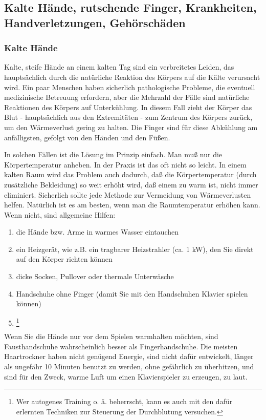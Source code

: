 
\subsection{Kalte Hände, rutschende Finger, Krankheiten, Handverletzungen, Gehörschäden}
\label{c1iii10}

\subsubsection{Kalte Hände}

Kalte, steife Hände an einem kalten Tag sind ein verbreitetes Leiden, das hauptsächlich durch die natürliche Reaktion des Körpers auf die Kälte verursacht wird.
Ein paar Menschen haben sicherlich pathologische Probleme, die eventuell medizinische Betreuung erfordern, aber die Mehrzahl der Fälle sind natürliche Reaktionen des Körpers auf Unterkühlung.
In diesem Fall zieht der Körper das Blut - hauptsächlich aus den Extremitäten - zum Zentrum des Körpers zurück, um den Wärmeverlust gering zu halten.
Die Finger sind für diese Abkühlung am anfälligsten, gefolgt von den Händen und den Füßen.

In solchen Fällen ist die Lösung im Prinzip einfach.
Man muß nur die Körpertemperatur anheben.
In der Praxis ist das oft nicht so leicht.
In einem kalten Raum wird das Problem auch dadurch, daß die Körpertemperatur (durch zusätzliche Bekleidung) so weit erhöht wird, daß einem zu warm ist, nicht immer eliminiert.
Sicherlich sollte jede Methode zur Vermeidung von Wärmeverlusten helfen.
Natürlich ist es am besten, wenn man die Raumtemperatur erhöhen kann.
Wenn nicht, sind allgemeine Hilfen:
\begin{enumerate}[label={\arabic*.}] 
\item die Hände bzw. Arme in warmes Wasser eintauchen
\item ein Heizgerät, wie z.B. ein tragbarer Heizstrahler (ca. 1 kW), den Sie direkt auf den Körper richten können
\item dicke Socken, Pullover oder thermale Unterwäsche
\item Handschuhe ohne Finger (damit Sie mit den Handschuhen Klavier spielen können)
\item \footnote{Wer autogenes Training o. ä. beherrscht, kann es auch mit den dafür erlernten Techniken zur Steuerung der Durchblutung versuchen.}
 \end{enumerate}
Wenn Sie die Hände nur vor dem Spielen warmhalten möchten, sind Fausthandschuhe wahrscheinlich besser als Fingerhandschuhe.
Die meisten Haartrockner haben nicht genügend Energie, sind nicht dafür entwickelt, länger als ungefähr 10 Minuten benutzt zu werden, ohne gefährlich zu überhitzen, und sind für den Zweck, warme Luft um einen Klavierspieler zu erzeugen, zu laut.


